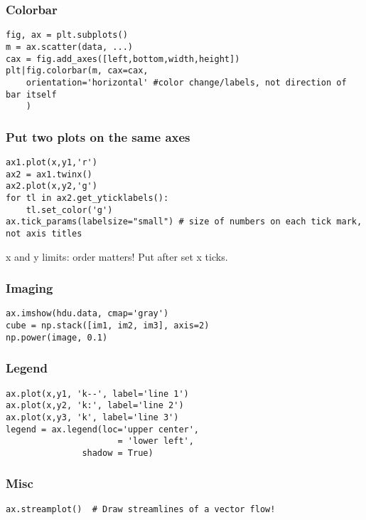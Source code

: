 \documentclass{article}
\begin{document}
\begin{multicols}{2}
\subsubsection{Colorbar}
\begin{lstlisting}
fig, ax = plt.subplots()
m = ax.scatter(data, ...)
cax = fig.add_axes([left,bottom,width,height])
plt|fig.colorbar(m, cax=cax,
    orientation='horizontal' #color change/labels, not direction of bar itself
    )
\end{lstlisting}

\subsubsection{Put two plots on the same axes}
\begin{lstlisting}
ax1.plot(x,y1,'r')
ax2 = ax1.twinx()
ax2.plot(x,y2,'g')
for tl in ax2.get_yticklabels():
    tl.set_color('g')
ax.tick_params(labelsize="small") # size of numbers on each tick mark, not axis titles
\end{lstlisting}
x and y limits: order matters! Put after set x ticks.

\subsubsection{Imaging}
\begin{lstlisting}
ax.imshow(hdu.data, cmap='gray')
cube = np.stack([im1, im2, im3], axis=2)
np.power(image, 0.1)
\end{lstlisting}

\subsubsection{Legend}
\begin{lstlisting}
ax.plot(x,y1, 'k--', label='line 1')
ax.plot(x,y2, 'k:', label='line 2')
ax.plot(x,y3, 'k', label='line 3')
legend = ax.legend(loc='upper center',
                      = 'lower left',
               shadow = True)
\end{lstlisting}

\subsubsection{Misc}
\begin{lstlisting}
ax.streamplot()  # Draw streamlines of a vector flow!
\end{lstlisting}
\end{multicols}

\restoregeometry
\end{document}
